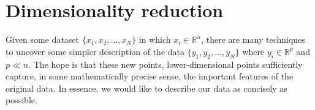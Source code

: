 \documentclass[11pt]{article}
\begin{document}




\section{Dimensionality reduction}

Given some dataset $\{x_1, x_2, ..., x_N\}$ in which $x_i \in \mathbb{R}^n$, there are many techniques to uncover some simpler description of the data $\{y_1, y_2, ..., y_N\}$ where $y_i \in \mathbb{R}^p$ and $p \ll n$. The hope is that these new points, lower-dimensional points sufficiently capture, in some mathematically precise sense, the important features of the original data. In essence, we would like to describe our data as concisely as possible.
\end{document}
